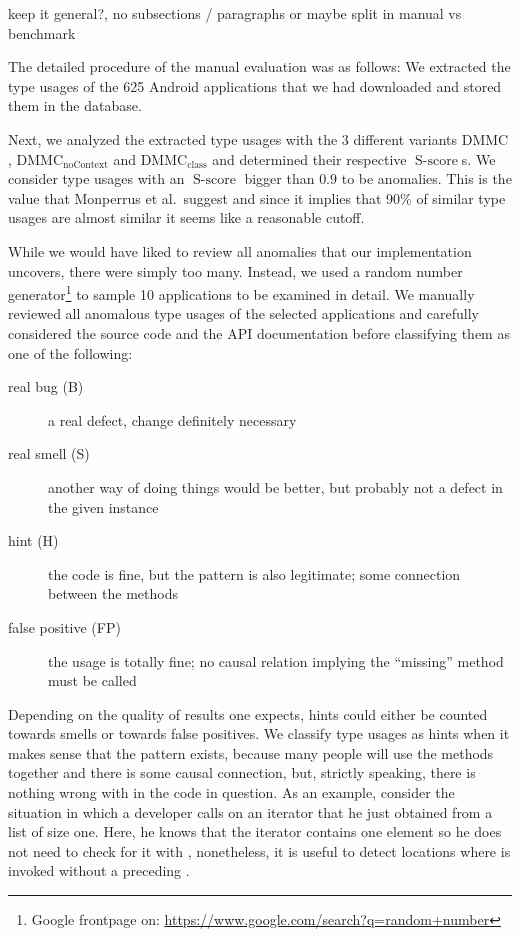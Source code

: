 keep it general?, no subsections / paragraphs
or maybe split in manual vs benchmark

The detailed procedure of the manual evaluation was as follows:
We extracted the type usages of the 625 Android applications that we had downloaded and stored them in the database.

Next, we analyzed the extracted type usages with the 3 different variants $\text{DMMC}$, $\text{DMMC}_{\text{noContext}}$ and $\text{DMMC}_{\text{class}}$ and determined their respective $\operatorname{S-score}$s.
We consider type usages with an $\operatorname{S-score}$ bigger than $0.9$ to be anomalies.
This is the value that Monperrus et al.\ suggest and since it implies that 90\% of similar type usages are almost similar it seems like a reasonable cutoff.

While we would have liked to review all anomalies that our implementation uncovers, there were simply too many.
Instead, we used a random number generator\footnote{Google frontpage on: \url{https://www.google.com/search?q=random+number}} to sample 10 applications to be examined in detail.
We manually reviewed all anomalous type usages of the selected applications and carefully considered the source code and the API documentation before classifying them as one of the following:
\begin{description}
    \item [real bug (B)] a real defect, change definitely necessary
    \item [real smell (S)] another way of doing things would be better, but probably not a defect in the given instance
    \item [hint (H)] the code is fine, but the pattern is also legitimate; some connection between the methods
    \item [false positive (FP)] the usage is totally fine; no causal relation implying the ``missing'' method must be called
\end{description}


Depending on the quality of results one expects, hints could either be counted towards smells or towards false positives.
We classify type usages as hints when it makes sense that the pattern exists, because many people will use the methods together and there is some causal connection, but, strictly speaking, there is nothing wrong with in the code in question.
As an example, consider the situation in which a developer calls  on an iterator that he just obtained from a list of size one.
Here, he knows that the iterator contains one element so he does not need to check for it with , nonetheless, it is useful to detect locations where  is invoked without a preceding .

